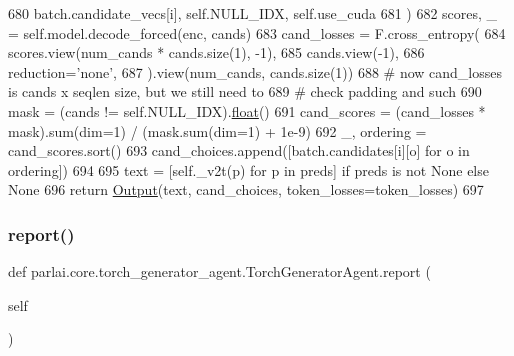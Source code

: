 \begin{DoxyCode}
680                     batch.candidate\_vecs[i], self.NULL\_IDX, self.use\_cuda
681                 )
682                 scores, \_ = self.model.decode\_forced(enc, cands)
683                 cand\_losses = F.cross\_entropy(
684                     scores.view(num\_cands * cands.size(1), -1),
685                     cands.view(-1),
686                     reduction=\textcolor{stringliteral}{'none'},
687                 ).view(num\_cands, cands.size(1))
688                 \textcolor{comment}{# now cand\_losses is cands x seqlen size, but we still need to}
689                 \textcolor{comment}{# check padding and such}
690                 mask = (cands != self.NULL\_IDX).\hyperlink{namespaceprojects_1_1controllable__dialogue_1_1make__control__dataset_aa2b7207688c641dbc094ab44eca27113}{float}()
691                 cand\_scores = (cand\_losses * mask).sum(dim=1) / (mask.sum(dim=1) + 1e-9)
692                 \_, ordering = cand\_scores.sort()
693                 cand\_choices.append([batch.candidates[i][o] \textcolor{keywordflow}{for} o \textcolor{keywordflow}{in} ordering])
694 
695         text = [self.\_v2t(p) \textcolor{keywordflow}{for} p \textcolor{keywordflow}{in} preds] \textcolor{keywordflow}{if} preds \textcolor{keywordflow}{is} \textcolor{keywordflow}{not} \textcolor{keywordtype}{None} \textcolor{keywordflow}{else} \textcolor{keywordtype}{None}
696         \textcolor{keywordflow}{return} \hyperlink{namespaceparlai_1_1agents_1_1legacy__agents_1_1seq2seq_1_1torch__agent__v1_a2689006ea97d09413fb242f984bd8016}{Output}(text, cand\_choices, token\_losses=token\_losses)
697 
\end{DoxyCode}
\mbox{\label{classparlai_1_1core_1_1torch__generator__agent_1_1TorchGeneratorAgent_a3ed32722f939a8afd258830b7093fc18}} 
\subsubsection{\texorpdfstring{report()}{report()}}
{\footnotesize\ttfamily def parlai.\+core.\+torch\+\_\+generator\+\_\+agent.\+Torch\+Generator\+Agent.\+report (\begin{DoxyParamCaption}\item[{}]{self }\end{DoxyParamCaption})}

